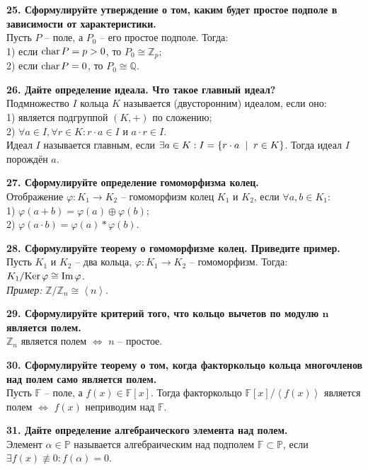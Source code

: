 \documentclass[11pt,a4paper]{article}
\newcommand{\Z}{\mathbb{Z}}
\newcommand{\Q}{\mathbb{Q}}
\newcommand{\F}{\mathbb{F}}
\newcommand{\Ker}[1]{\mathrm{Ker}\hspace{0.5mm}#1}
\renewcommand{\Im}[1]{\mathrm{Im}\hspace{0.5mm}#1}
\newcommand{\Char}[1]{\mathrm{char}\hspace{0.5mm}#1}
\renewcommand{\mid}{\hspace{2mm}\middle|\hspace{2mm}}
\begin{document}
\textbf{25. Сформулируйте утверждение о том, каким будет простое подполе в зависимости от характеристики.\\}
Пусть $P$ -- поле, а $P_0$ -- его простое подполе. Тогда:\\
1) если $\Char{P} = p > 0$, то $P_0 \cong \Z_p$;\\
2) если $\Char{P} = 0$, то $P_0 \cong \Q$.

\textbf{26. Дайте определение идеала. Что такое главный идеал?\\}
Подмножество $I$ кольца $K$ называется (двусторонним) идеалом, если оно:\\
1) является подгруппой $\left( K, + \right)$ по сложению;\\
2) $\forall a \in I, \forall r \in K: r \cdot a \in I$ и $a \cdot r \in I$.\\
Идеал $I$ называется главным, если $\exists a \in K: I = \left\{ r \cdot a \mid r \in K \right\}$. Тогда идеал $I$ порождён $a$.

\textbf{27. Сформулируйте определение гомоморфизма колец.\\}
Отображение $\varphi : K_1 \rightarrow K_2$ -- гомоморфизм колец $K_1$ и $K_2$, если $\forall a, b \in K_1:$\\
1) $\varphi (a + b) = \varphi (a) \oplus \varphi (b)$;\\
2) $\varphi (a \cdot b) = \varphi (a) * \varphi (b)$.

\textbf{28. Сформулируйте теорему о гомоморфизме колец. Приведите пример.\\}
Пусть $K_1$ и $K_2$ -- два кольца, $\varphi : K_1 \rightarrow K_2$ -- гомоморфизм. Тогда: $K_1 / \Ker{\varphi} \cong \Im{\varphi}$.\\
\textit{Пример:} $\Z / \Z_n \cong \left\langle n \right\rangle$.
\pagebreak

\textbf{29. Сформулируйте критерий того, что кольцо вычетов по модулю $\boldsymbol{n}$ является полем.\\}
$\Z_n$ является полем $\Leftrightarrow$ $n$ -- простое.

\textbf{30. Сформулируйте теорему о том, когда факторкольцо кольца многочленов над полем само является полем.\\}
Пусть $\F$ -- поле, а $f(x) \in \F[x]$. Тогда факторкольцо $\F[x] / \left\langle f(x) \right\rangle$ является полем $\Leftrightarrow$ $f(x)$ неприводим над $\F$.

\textbf{31. Дайте определение алгебраического элемента над полем.\\}
Элемент $\alpha \in \mathbb{P}$ называется алгебраическим над подполем $\F \subset \mathbb{P}$, если $\exists f(x) \not\equiv 0: f( \alpha ) = 0$.
\end{document}
